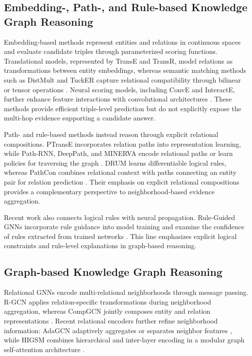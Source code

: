\documentclass[a4paper,fleqn]{cas-dc}
\begin{document}
\subsection{Embedding-, Path-, and Rule-based Knowledge Graph Reasoning}\label{subsec:embedding-path-reasoning}

Embedding-based methods represent entities and relations in continuous spaces and evaluate candidate triples through parameterized scoring functions. Translational models, represented by TransE and TransR, model relations as transformations between entity embeddings, whereas semantic matching methods such as DistMult and TuckER capture relational compatibility through bilinear or tensor operations \citep{Bordes2013TransE,Lin2015TransR,Yang2015DistMult,Balazevic2019TuckER}. Neural scoring models, including ConvE and InteractE, further enhance feature interactions with convolutional architectures \citep{Dettmers2018ConvE,Vashishth2020InteractE}. These methods provide efficient triple-level prediction but do not explicitly expose the multi-hop evidence supporting a candidate answer.

Path- and rule-based methods instead reason through explicit relational compositions. PTransE incorporates relation paths into representation learning, while Path-RNN, DeepPath, and MINERVA encode relational paths or learn policies for traversing the graph \citep{Lin2015PTransE,Das2017PathRNN,Xiong2017DeepPath,Das2018MINERVA}. DRUM learns differentiable logical rules, whereas PathCon combines relational context with paths connecting an entity pair for relation prediction \citep{Sadeghian2019DRUM,Wang2021PathCon}. Their emphasis on explicit relational compositions provides a complementary perspective to neighborhood-based evidence aggregation.

Recent work also connects logical rules with neural propagation. Rule-Guided GNNs incorporate rule guidance into model training and examine the confidence of rules extracted from trained networks \citep{RuleGuidedGNN2025}. This line emphasizes explicit logical constraints and rule-level explanations in graph-based reasoning.

\subsection{Graph-based Knowledge Graph Reasoning}\label{subsec:progressive-gnn-reasoning}

Relational GNNs encode multi-relational neighborhoods through message passing. R-GCN applies relation-specific transformations during neighborhood aggregation, whereas CompGCN jointly composes entity and relation representations \citep{Schlichtkrull2018RGCN,Vashishth2020CompGCN}. Recent relational encoders further refine neighborhood information: AdaGCN adaptively aggregates or separates neighbor features \citep{AdaGCN2025}, while HIGSM combines hierarchical and inter-layer encoding in a modular graph self-attention architecture \citep{HIGSM2025}.
\end{document}
